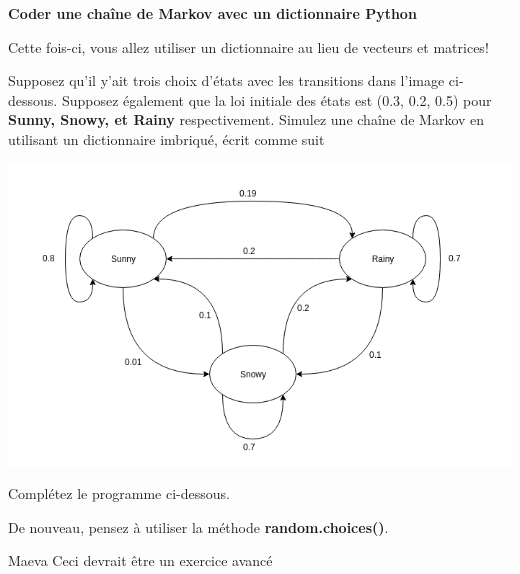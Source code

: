 \begin{Exercice}[20 minutes]\textbf{Coder une chaîne de Markov avec un dictionnaire Python}

Cette fois-ci, vous allez utiliser un dictionnaire au lieu de vecteurs et matrices!

Supposez qu'il y'ait trois choix d'états avec les transitions dans l'image ci-dessous. Supposez également que la loi initiale des états est (0.3, 0.2, 0.5) pour \textbf{Sunny, Snowy, et Rainy} respectivement. Simulez une chaîne de Markov en utilisant un dictionnaire imbriqué, écrit comme suit

\begin{center}
        \includegraphics[width=\linewidth]{Etats_markov.png}
\end{center}
    
Complétez le programme ci-dessous.


\begin{conseil}
    De nouveau, pensez à utiliser la méthode \textbf{random.choices()}.
\end{conseil}
\begin{solution}
    
\end{solution}
\end{Exercice}

\begin{note}{Maeva}
    Ceci devrait être un exercice avancé
\end{note}
\newpage
